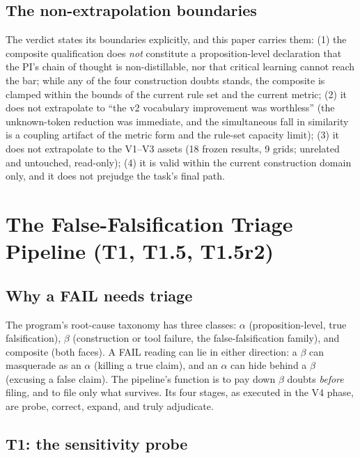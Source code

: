 \documentclass[11pt]{article}
\begin{document}
\subsection{The non-extrapolation boundaries}

The verdict states its boundaries explicitly, and this paper carries them: (1) the composite qualification does \emph{not} constitute a proposition-level declaration that the PI's chain of thought is non-distillable, nor that critical learning cannot reach the bar; while any of the four construction doubts stands, the composite is clamped within the bounds of the current rule set and the current metric; (2) it does not extrapolate to ``the v2 vocabulary improvement was worthless'' (the unknown-token reduction was immediate, and the simultaneous fall in similarity is a coupling artifact of the metric form and the rule-set capacity limit); (3) it does not extrapolate to the V1--V3 assets (18 frozen results, 9 grids; unrelated and untouched, read-only); (4) it is valid within the current construction domain only, and it does not prejudge the task's final path.

\section{The False-Falsification Triage Pipeline (T1, T1.5, T1.5r2)}\label{sec:pipeline}

\subsection{Why a FAIL needs triage}

The program's root-cause taxonomy has three classes: $\alpha$ (proposition-level, true falsification), $\beta$ (construction or tool failure, the false-falsification family), and composite (both faces). A FAIL reading can lie in either direction: a $\beta$ can masquerade as an $\alpha$ (killing a true claim), and an $\alpha$ can hide behind a $\beta$ (excusing a false claim). The pipeline's function is to pay down $\beta$ doubts \emph{before} filing, and to file only what survives. Its four stages, as executed in the V4 phase, are probe, correct, expand, and truly adjudicate.

\subsection{T1: the sensitivity probe}
\end{document}
